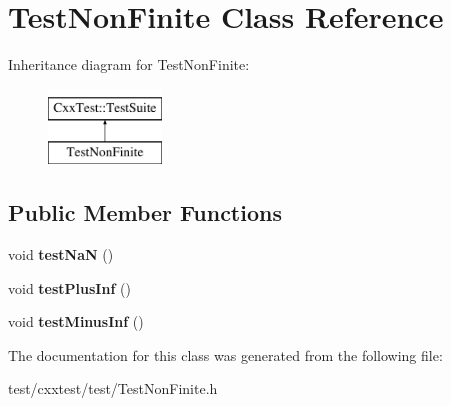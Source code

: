 \hypertarget{classTestNonFinite}{\section{Test\-Non\-Finite Class Reference}
\label{classTestNonFinite}
}
Inheritance diagram for Test\-Non\-Finite\-:\begin{figure}[H]
\begin{center}
\leavevmode
\includegraphics[height=2.000000cm]{classTestNonFinite}
\end{center}
\end{figure}
\subsection*{Public Member Functions}
\begin{DoxyCompactItemize}
\item 
\hypertarget{classTestNonFinite_ac97125a3091c28e12046901d4c8d4c84}{void {\bfseries test\-Na\-N} ()}\label{classTestNonFinite_ac97125a3091c28e12046901d4c8d4c84}

\item 
\hypertarget{classTestNonFinite_ab9db86c74efd6d0608fadfd31c3528e2}{void {\bfseries test\-Plus\-Inf} ()}\label{classTestNonFinite_ab9db86c74efd6d0608fadfd31c3528e2}

\item 
\hypertarget{classTestNonFinite_adfa57af94da37cff15cbc59ae811efa5}{void {\bfseries test\-Minus\-Inf} ()}\label{classTestNonFinite_adfa57af94da37cff15cbc59ae811efa5}

\end{DoxyCompactItemize}


The documentation for this class was generated from the following file\-:\begin{DoxyCompactItemize}
\item 
test/cxxtest/test/Test\-Non\-Finite.\-h\end{DoxyCompactItemize}
